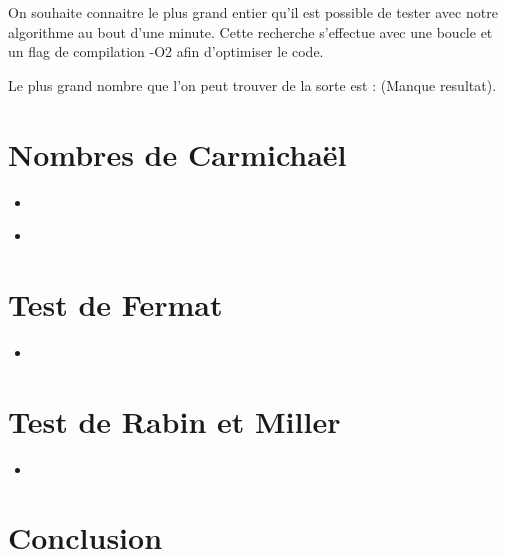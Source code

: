 \documentclass{article}
\newcommand{\cscript}[2]{
\begin{itemize}
\item[]
\end{itemize}
}
\begin{document}
On souhaite connaitre le plus grand entier qu'il est possible de tester avec notre algorithme au bout d'une minute. Cette recherche s'effectue avec une boucle et un flag de compilation -O2 afin d'optimiser le code.

Le plus grand nombre que l'on peut trouver de la sorte est : (Manque resultat).


\newpage
\section{Nombres de Carmicha\"el}

\cscript{is_carmichael}{is\_carmichael}
\cscript{gen_carmichael}{gen\_carmichael}

\newpage
\section{Test de Fermat}

\cscript{testFermat}{testFermat}

\newpage
\section{Test de Rabin et Miller}

\cscript{testRabinMiller}{testRabinMiller}
\newpage
\section{Conclusion}

\end{document}
